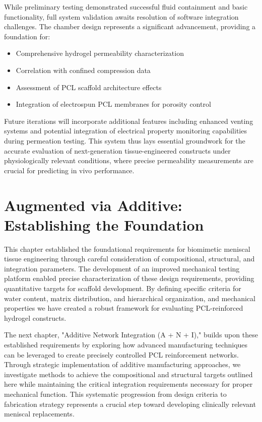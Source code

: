 While preliminary testing demonstrated successful fluid containment and basic functionality, full system validation awaits resolution of software integration challenges. The chamber design represents a significant advancement, providing a foundation for:

\begin{itemize}
    \item Comprehensive hydrogel permeability characterization
    \item Correlation with confined compression data
    \item Assessment of PCL scaffold architecture effects
    \item Integration of electrospun PCL membranes for porosity control
\end{itemize}

Future iterations will incorporate additional features including enhanced venting systems and potential integration of electrical property monitoring capabilities during permeation testing. This system thus lays essential groundwork for the accurate evaluation of next-generation tissue-engineered constructs under physiologically relevant conditions, where precise permeability measurements are crucial for predicting in vivo performance.


\section{Augmented via Additive: Establishing the Foundation}

This chapter established the foundational requirements for biomimetic meniscal tissue engineering through careful consideration of compositional, structural, and integration parameters. The development of an improved mechanical testing platform enabled precise characterization of these design requirements, providing quantitative targets for scaffold development. By defining specific criteria for water content, matrix distribution, and hierarchical organization, and mechanical properties we have created a robust framework for evaluating PCL-reinforced hydrogel constructs.

The next chapter, "Additive Network Integration (A + N + I)," builds upon these established requirements by exploring how advanced manufacturing techniques can be leveraged to create precisely controlled PCL reinforcement networks. Through strategic implementation of additive manufacturing approaches, we investigate methods to achieve the compositional and structural targets outlined here while maintaining the critical integration requirements necessary for proper mechanical function. This systematic progression from design criteria to fabrication strategy represents a crucial step toward developing clinically relevant meniscal replacements.